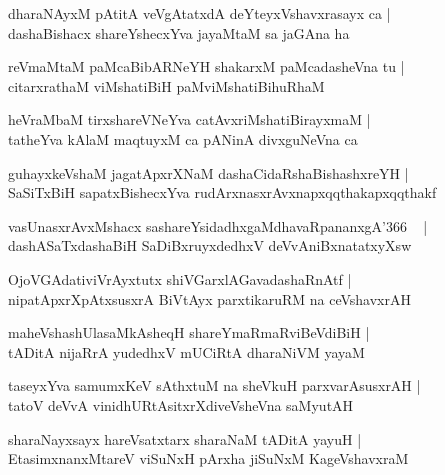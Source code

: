 \documentclass[twoside,12pt,openright]{book}
\newcounter{shloka}[chapter]
\begin{document}
\begin{shloka}%
dharaNAyxM pAtitA veVgAtatxdA deYteyxVshavxrasayx ca |\\
dashaBishacx shareYshecxYva jayaMtaM sa jaGAna ha 
\end{shloka}

\begin{shloka}%
reVmaMtaM paMcaBibARNeYH shakarxM paMcadasheVna tu |\\
citarxrathaM viMshatiBiH paMviMshatiBihuRhaM 
\end{shloka}

\begin{shloka}%
heVraMbaM tirxshareVNeYva catAvxriMshatiBirayxmaM |\\
tatheYva kAlaM maqtuyxM ca pANinA divxguNeVna ca 
\end{shloka}

\begin{shloka}%
guhayxkeVshaM jagatApxrXNaM dashaCidaRshaBishashxreYH |\\
SaSiTxBiH sapatxBishecxYva rudArxnasxrAvxnapxqqthakapxqqthakf
\end{shloka}

\begin{shloka}%
vasUnasxrAvxMshacx sashareYsidadhxgaMdhavaRpananxgA\char'366 ~ |\\
dashASaTxdashaBiH SaDiBxruyxdedhxV deVvAniBxnatatxyXsw
\end{shloka}

\begin{shloka}%
OjoVGAdativiVrAyxtutx shiVGarxlAGavadashaRnAtf |\\
nipatApxrXpAtxsusxrA BiVtAyx parxtikaruRM na ceVshavxrAH 
\end{shloka}

\begin{shloka}%
maheVshashUlasaMkAsheqH shareYmaRmaRviBeVdiBiH |\\
tADitA nijaRrA yudedhxV mUCiRtA dharaNiVM yayaM 
\end{shloka}

\begin{shloka}%
taseyxYva samumxKeV sAthxtuM na sheVkuH parxvarAsusxrAH |\\
tatoV deVvA vinidhURtAsitxrXdiveVsheVna saMyutAH 
\end{shloka}

\begin{shloka}%
sharaNayxsayx hareVsatxtarx sharaNaM tADitA yayuH |\\
EtasimxnanxMtareV viSuNxH pArxha jiSuNxM KageVshavxraM 
\end{shloka}
\end{document}
